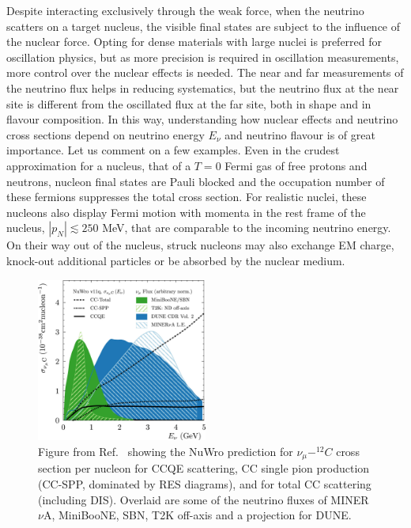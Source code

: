 Despite interacting exclusively through the weak force, when the neutrino scatters on a target nucleus, the visible final states are subject to the influence of the nuclear force. Opting for dense materials with large nuclei is preferred for oscillation physics, but as more precision is required in oscillation measurements, more control over the nuclear effects is needed. The near and far measurements of the neutrino flux helps in reducing systematics, but the neutrino flux at the near site is different from the oscillated flux at the far site, both in shape and in flavour composition. In this way, understanding how nuclear effects and neutrino cross sections depend on neutrino energy $E_\nu$ and neutrino flavour is of great importance. Let us comment on a few examples. Even in the crudest approximation for a nucleus, that of a $T=0$ Fermi gas of free protons and neutrons, nucleon final states are Pauli blocked and the occupation number of these fermions suppresses the total cross section. For realistic nuclei, these nucleons also display Fermi motion with momenta in the rest frame of the nucleus, $|p_N| \lesssim 250$ MeV, that are comparable to the incoming neutrino energy. On their way out of the nucleus, struck nucleons may also exchange EM charge, knock-out additional particles or be absorbed by the nuclear medium. 
%
\begin{figure}[t]
\centering
\includegraphics[width=0.5\textwidth]{cross_sections.jpg}
  \caption[Neutrino cross sections and the neutrino flux of current and future accelerator experiments.]{Figure from Ref.~\cite{Betancourt:2018bpu} showing the NuWro prediction for $\nu_\mu-^{12}C$ cross section per nucleon for {CCQE} scattering, CC single pion production (CC-SPP, dominated by {RES} diagrams), and for total CC scattering (including {DIS}). Overlaid are some of the neutrino fluxes of MINER$\nu$A, MiniBooNE, SBN, T2K off-axis and a projection for DUNE. \label{fig:compare_cross_sections}}
\end{figure}
